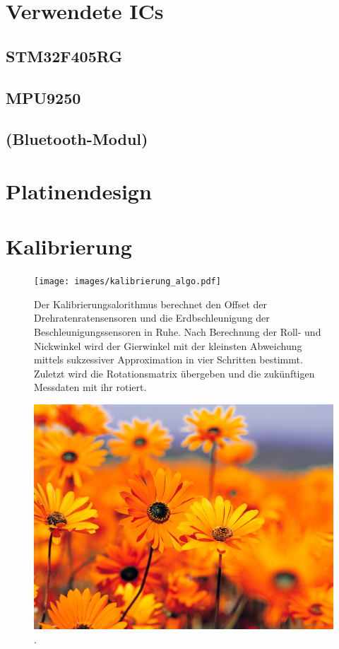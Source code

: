 \section{Verwendete ICs}

	\subsection{STM32F405RG}
	
	\subsection{MPU9250}
	
	\subsection{(Bluetooth-Modul)}
	
\section{Platinendesign}

\newpage

\section{Kalibrierung}

	\begin{figure}[h]
		\centering
		\texttt{[image: images/kalibrierung\_algo.pdf]}
		\caption[Flow-Chart des Kalibrierungsalorithmus]{Der Kalibrierungsalorithmus berechnet den Offset der Drehratenratensensoren und die Erdbschleunigung der Beschleunigungssensoren in Ruhe. Nach Berechnung der Roll- und Nickwinkel wird der Gierwinkel mit der kleinsten Abweichung mittels sukzessiver Approximation in vier Schritten bestimmt. Zuletzt wird die Rotationsmatrix übergeben und die zukünftigen Messdaten mit ihr rotiert.}
		\label{img:kalibrierung-algo}
	\end{figure}

	\begin{figure}[h]
		\centering
		\includegraphics[width=1\textwidth]{images/Messergebnisse/calibration-sar-error}
		\caption[Abweichung der Voder- und Rückvektoren]{.}
		\label{img:kalibrierung-sar-error}
	\end{figure}

